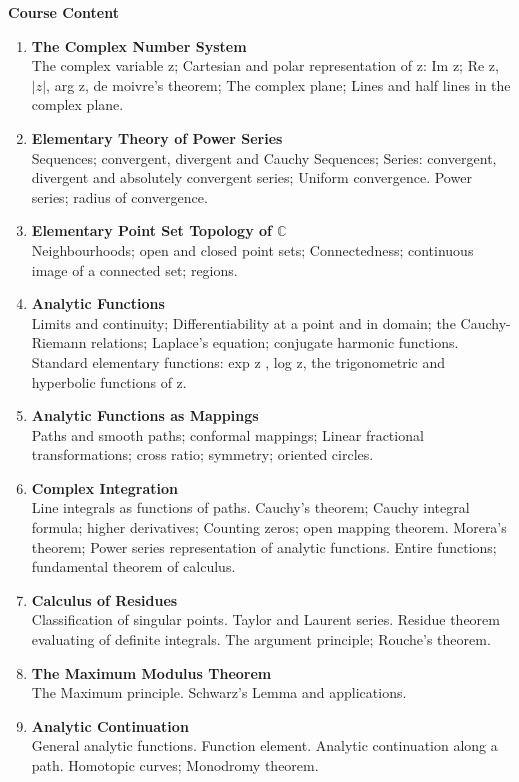 \documentclass[11pt,a4paper]{article}
\theoremstyle{definition}
\begin{document}
\textbf{Course Content}
\begin{enumerate}
\item \textbf{The Complex Number System}\\
The complex variable z; Cartesian and polar representation of z: Im z; Re z, $|z|$, arg z, de moivre's theorem; The complex plane; Lines and half lines in the complex plane.

\item\textbf{Elementary Theory of Power Series}\\
Sequences; convergent, divergent and Cauchy Sequences; Series: convergent, divergent and absolutely convergent series; Uniform convergence. Power series; radius of convergence.


\item \textbf{Elementary Point Set Topology of $\mathbb{C}$}\\
Neighbourhoods; open and closed point sets; Connectedness; continuous image of a connected set; regions.


\item \textbf{Analytic Functions}\\
Limits and continuity; Differentiability at a point and in domain; the Cauchy-Riemann relations; Laplace's equation; conjugate harmonic functions. Standard elementary functions: exp z , log z, the trigonometric and hyperbolic functions of z.


\item \textbf{Analytic Functions as Mappings}\\
Paths and smooth paths; conformal mappings; Linear fractional transformations; cross ratio; symmetry; oriented circles.


\item \textbf{Complex Integration}\\
Line integrals as functions of paths. Cauchy's theorem; Cauchy integral formula; higher derivatives; Counting zeros; open mapping theorem. Morera's theorem; Power series representation of analytic functions. Entire functions; fundamental theorem of calculus.

\item \textbf{Calculus of Residues}\\
Classification of singular points. Taylor and Laurent series. Residue theorem evaluating of definite integrals. The argument principle; Rouche's theorem.


\item \textbf{The Maximum Modulus Theorem}\\
The Maximum principle. Schwarz's Lemma and applications.


\item \textbf{Analytic Continuation}\\
General analytic functions. Function element. Analytic continuation along a path. Homotopic curves; Monodromy theorem.
\end{enumerate}
\end{document}
